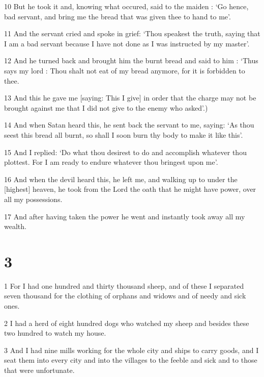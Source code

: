 \par 10 But he took it and, knowing what occured, said to the maiden : ‘Go hence, bad servant, and bring me the bread that was given thee to hand to me’.

\par 11 And the servant cried and spoke in grief: ‘Thou speakest the truth, saying that I am a bad servant because I have not done as I was instructed by my master’.

\par 12 And he turned back and brought him the burnt bread and said to him : ‘Thus says my lord : Thou shalt not eat of my bread anymore, for it is forbidden to thee.

\par 13 And this he gave me [saying: This I give] in order that the charge may not be brought against me that I did not give to the enemy who asked’.)

\par 14 And when Satan heard this, he sent back the servant to me, saying: ‘As thou seest this bread all burnt, so shall I soon burn thy body to make it like this’.

\par 15 And I replied: ‘Do what thou desirest to do and accomplish whatever thou plottest. For I am ready to endure whatever thou bringest upon me’.

\par 16 And when the devil heard this, he left me, and walking up to under the [highest] heaven, he took from the Lord the oath that he might have power, over all my possessions.

\par 17 And after having taken the power he went and instantly took away all my wealth.

\chapter{3}

\par 1 For I had one hundred and thirty thousand sheep, and of these I separated seven thousand for the clothing of orphans and widows and of needy and sick ones.

\par 2 I had a herd of eight hundred dogs who watched my sheep and besides these two hundred to watch my house.

\par 3 And I had nine mills working for the whole city and ships to carry goods, and I seat them into every city and into the villages to the feeble and sick and to those that were unfortunate.

